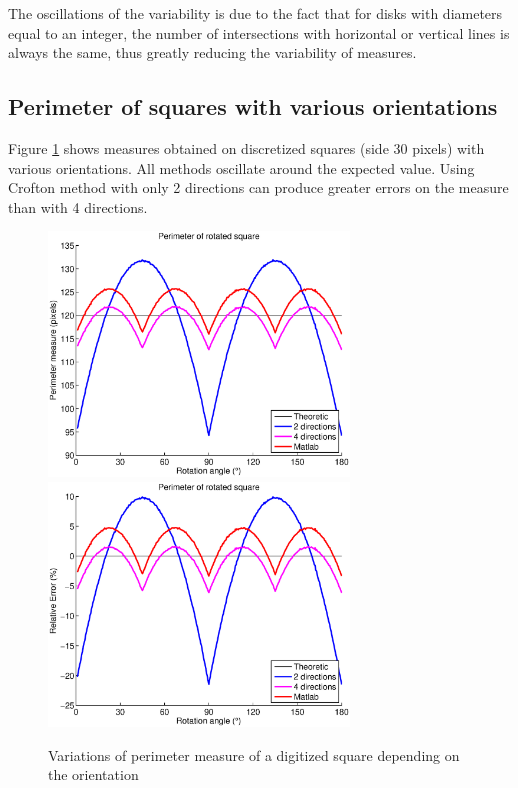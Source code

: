 \documentclass{InsightArticle}
\begin{document}
The oscillations of the variability is due to the fact that for disks with diameters equal to an
integer, the number of intersections with horizontal or vertical lines is always the same, 
thus greatly reducing the variability of measures. 

\subsection{Perimeter of squares with various orientations}

Figure \ref{fig:MeasureSquareOriented} shows measures obtained on discretized squares (side 30 pixels)
with various orientations. All methods oscillate around the expected value. 
Using Crofton method with only 2 directions can produce greater errors on the measure than with 4 
directions.


\begin{figure}[!htb]
\begin{center}
\includegraphics[width=8cm]{images/errorSquareRotated}
\includegraphics[width=8cm]{images/errorRelSquareRotated}
\end{center}
\caption{Variations of perimeter measure of a digitized square depending on the orientation}
\label{fig:MeasureSquareOriented}
\end{figure}
\end{document}
